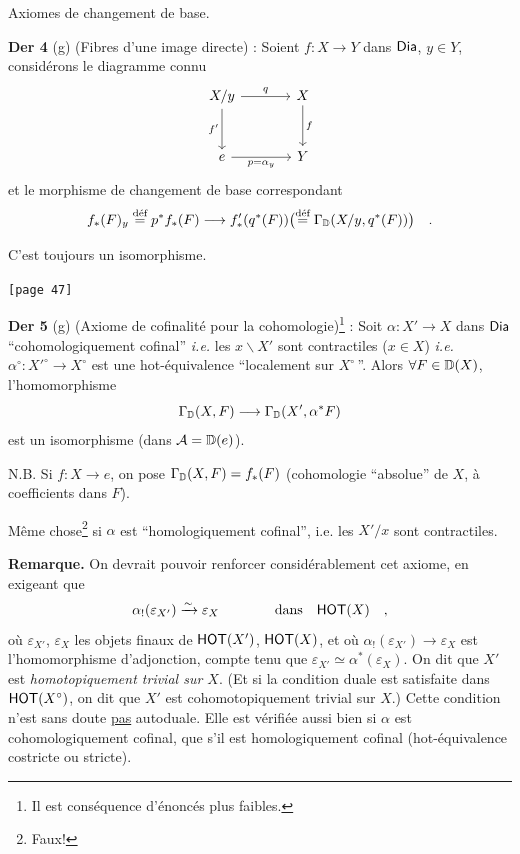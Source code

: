 \noindent Axiomes de changement de base.

\noindent\textbf{Der 4} (g) (Fibres d'une image directe) : Soient $f : X \to Y$ dans $\mathsf{Dia}$, $y \in Y$, considérons le diagramme connu
\[
\begin{tikzcd}[row sep=large, column sep=large]
X/y \arrow[r, "q"] \arrow[d, "f'"'] & X \arrow[d, "f"] \\
e \arrow[r, "p = \alpha_{y}"'] & Y
\end{tikzcd}
\]
et le morphisme de changement de base correspondant
\[ f_{*}(F)_{y} \overset{\text{déf}}{=} p^{*} f_{*}(F) \longrightarrow f'_{*}(q^{*}(F))\bigl(\overset{\text{déf}}{=} \Gamma_{\mathbb{D}}(X/y, q^{*}(F))\bigr) \quad . \]

\noindent C'est toujours un isomorphisme.

\noindent{}\texttt{[page 47]}

\noindent\textbf{Der 5} (g) (Axiome de cofinalité pour la cohomologie)\footnote[14]{Il est conséquence d'énoncés plus faibles.} : Soit $\alpha : X' \to X$ dans $\mathsf{Dia}$ “cohomologiquement cofinal” \textit{i.e.} les $x\backslash X'$ sont contractiles ($x \in X$) \textit{i.e.} $\alpha^{\circ} : {X'}^{\circ} \to X^{\circ}$ est une hot-équivalence “localement sur $X^{\circ}$\,”. Alors $\forall F \in \mathbb{D}(X)$, l'homomorphisme
\[ \Gamma_{\mathbb{D}}(X, F) \longrightarrow \Gamma_{\mathbb{D}}(X', \alpha^{*} F) \]
est un isomorphisme (dans $\mathcal{A} = \mathbb{D}(e)$).

\noindent N.B. Si $f : X \to e$, on pose $\Gamma_{\mathbb{D}}(X, F) = f_{*}(F)$ (cohomologie “absolue” de $X$, à coefficients dans $F$).

\noindent Même chose\footnote[15]{Faux!} si $\alpha$ est “homologiquement cofinal”, i.e. les $X'/x$ sont contractiles.



\noindent\textbf{Remarque.} On devrait pouvoir renforcer considérablement cet axiome, en exigeant que
\[ \alpha_{!}(\varepsilon_{X'}) \xrightarrow{\sim} \varepsilon_{X} \qquad\qquad \text{dans} \quad \mathsf{HOT}(X) \quad , \]
où $\varepsilon_{X'}$, $\varepsilon_{X}$ les objets finaux de $\mathsf{HOT}(X')$, $\mathsf{HOT}(X)$, et où $\alpha_{!}(\varepsilon_{X'}) \to \varepsilon_{X}$ est l'homomorphisme d'adjonction, compte tenu que $\varepsilon_{X'} \simeq \alpha^{*}(\varepsilon_{X})$. On dit que $X'$ est \textit{homotopiquement trivial sur $X$}. (Et si la condition duale est satisfaite dans $\mathsf{HOT}(X^{\circ})$, on dit que $X'$ est cohomotopiquement trivial sur $X$.) Cette condition n'est sans doute \underline{pas} autoduale. Elle est vérifiée aussi bien si $\alpha$ est cohomologiquement cofinal, que s'il est homologiquement cofinal (hot-équivalence costricte ou stricte).

